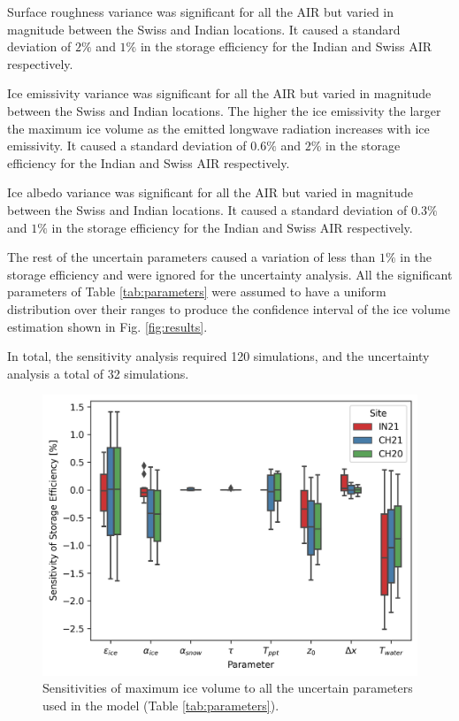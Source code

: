 \documentclass[utf8]{frontiersSCNS} %
\begin{document}
Surface roughness variance was significant for all the AIR but varied in magnitude between the Swiss and Indian
locations. It caused a standard deviation of $2\%$ and $1\%$ in the storage efficiency for the Indian and Swiss AIR
respectively.

Ice emissivity variance was significant for all the AIR but varied in magnitude between the Swiss and Indian
locations. The higher the ice emissivity the larger the maximum ice volume as the emitted longwave radiation increases
with ice emissivity.  It caused a standard deviation of $0.6\%$ and $2\%$ in the storage efficiency for the Indian and
Swiss AIR respectively.

Ice albedo variance was significant for all the AIR but varied in magnitude between the Swiss and Indian locations.
It caused a standard deviation of $0.3\%$ and $1\%$ in the storage efficiency for the Indian and Swiss AIR respectively.

The rest of the uncertain parameters caused a variation of less than $1\%$ in the storage efficiency and were ignored
for the uncertainty analysis. All the significant parameters of Table \ref{tab:parameters} were assumed to have a
uniform distribution over their ranges to produce the confidence interval of the ice volume estimation shown in Fig.
\ref{fig:results}.

In total, the sensitivity analysis required 120 simulations, and the uncertainty analysis a total of 32 simulations.

\begin{figure}
	\begin{center}
		\includegraphics[width=10 cm]{Figures/sensitivities.jpg}
	\end{center}
  \caption{Sensitivities of maximum ice volume to all the uncertain parameters used in the model (Table
\ref{tab:parameters}). } \label{fig:sensitivity} \end{figure}
\end{document}
